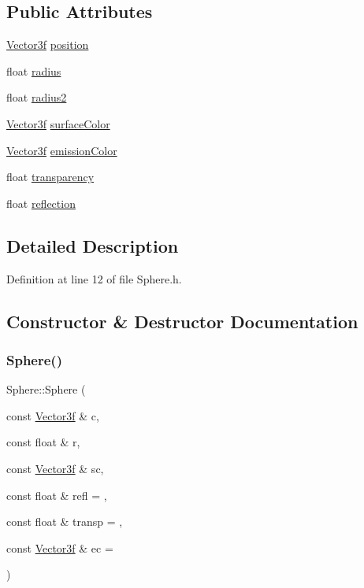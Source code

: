 \subsection*{Public Attributes}
\begin{DoxyCompactItemize}
\item 
\hyperlink{_vector3_8h_af345ad77ba5e240c7ab72b4b2077e754}{Vector3f} \hyperlink{class_sphere_a0458c2e8cd2b6472e6b32b4304b353d6}{position}
\item 
float \hyperlink{class_sphere_ae6f42f0da6679a2f0b4a22681ccccf38}{radius}
\item 
float \hyperlink{class_sphere_a676be49a940d037ac298e7010f03d416}{radius2}
\item 
\hyperlink{_vector3_8h_af345ad77ba5e240c7ab72b4b2077e754}{Vector3f} \hyperlink{class_sphere_accdb6ecbf2c62a19c495debfe7c3685a}{surface\+Color}
\item 
\hyperlink{_vector3_8h_af345ad77ba5e240c7ab72b4b2077e754}{Vector3f} \hyperlink{class_sphere_ab3bc31c7c6cd80578e755c85eb6e5894}{emission\+Color}
\item 
float \hyperlink{class_sphere_a93f7757b497ba9f0f93b9927e5d96e5d}{transparency}
\item 
float \hyperlink{class_sphere_a7b8835ace79e36f2cacf9ff0cb962fae}{reflection}
\end{DoxyCompactItemize}


\subsection{Detailed Description}


Definition at line 12 of file Sphere.\+h.



\subsection{Constructor \& Destructor Documentation}
\mbox{\label{class_sphere_a46b4e530fe3204b5dfc0547cec96dbaa}} 
\subsubsection{\texorpdfstring{Sphere()}{Sphere()}}
{\footnotesize\ttfamily Sphere\+::\+Sphere (\begin{DoxyParamCaption}\item[{const \hyperlink{_vector3_8h_af345ad77ba5e240c7ab72b4b2077e754}{Vector3f} \&}]{c,  }\item[{const float \&}]{r,  }\item[{const \hyperlink{_vector3_8h_af345ad77ba5e240c7ab72b4b2077e754}{Vector3f} \&}]{sc,  }\item[{const float \&}]{refl = {},  }\item[{const float \&}]{transp = {},  }\item[{const \hyperlink{_vector3_8h_af345ad77ba5e240c7ab72b4b2077e754}{Vector3f} \&}]{ec = {} }\end{DoxyParamCaption})\hspace{0.3cm}{\ttfamily [inline]}}



